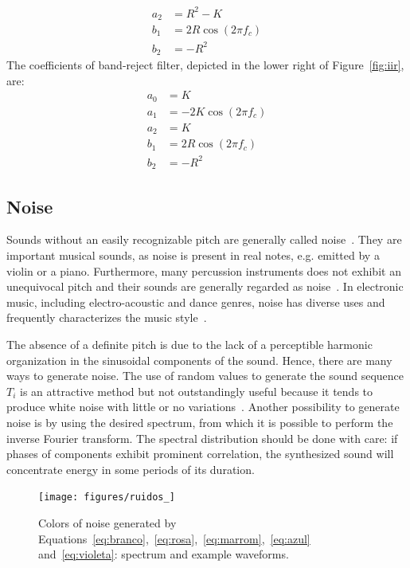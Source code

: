 \begin{enumerate}
\begin{equation}
\begin{split}
 a_2 & =  R^2-K \\
 b_1 & =  2R \cos (2\pi f_c) \\
 b_2 & =  -R^2
 \end{split}
\end{equation}
The coefficients of band-reject filter, depicted in the lower right of Figure~\ref{fig:iir}, are:
\begin{equation}\label{eq:rejeita-banda}
 \begin{split}
 a_0 & =  K \\
 a_1 & =  -2K\cos (2\pi f_c) \\
 a_2 & =  K \\
 b_1 & =  2R \cos (2\pi f_c) \\
 b_2 & =  -R^2
\end{split}
\end{equation}
\end{enumerate}

\subsection{Noise}\label{subsec:ruidos}
Sounds without an easily recognizable pitch are generally called noise~\cite{Lacerda}. They are important musical sounds, as noise is present in real notes, e.g. emitted by a violin or a piano. Furthermore, many percussion instruments does not exhibit an unequivocal pitch and their sounds are generally regarded as noise~\cite{Roederer}. In electronic music, including electro-acoustic and dance genres, noise has diverse uses and frequently characterizes the music style~\cite{Cook}. 

The absence of a definite pitch is due to the lack of a perceptible harmonic organization in the sinusoidal components of the sound.
Hence, there are many ways to generate noise. The use of random values to generate the sound sequence $T_i$ is an attractive method but not outstandingly useful because it tends to produce white noise with little or no variations~\cite{Cook}. Another possibility to generate noise is by using the desired spectrum, from which it is possible to perform the inverse Fourier transform. The spectral distribution should be done with care: if phases of components exhibit prominent correlation, the synthesized sound will concentrate energy in some periods of its duration.

\begin{figure}
	\hspace*{-.75cm}
         \texttt{[image: figures/ruidos\_]}
     \caption{Colors of noise generated by Equations~\ref{eq:branco},~\ref{eq:rosa},~\ref{eq:marrom},~\ref{eq:azul} and~\ref{eq:violeta}: spectrum and example waveforms.}
         \label{fig:ruidos}
\end{figure}

